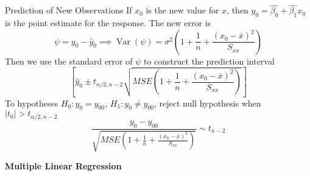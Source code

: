 \documentclass{article}
\DeclareMathOperator{\Var}{Var}
\begin{document}
\begin{multicols*}{3}
\begin{blackbox}{Prediction of New Observations}
        If $x_0$ is the new value for $x$, then $\hat{y}_0 = \hat{\beta_0} + \hat{\beta_1}x_0$ is the point estimate for the response. The new error is \\[-4ex]
        \[\psi = y_0 - \hat{y}_0 \implies \Var(\psi) = \sigma^2\left(1+\frac{1}{n} + \frac{(x_0-\bar{x})^2}{S_{xx}}\right)\]
        Then we use the standard error of $\psi$ to construct the prediction interval 
        \[\left[\hat{y}_0 \pm t_{\alpha/2, n-2} \sqrt{MSE\left(1+\frac{1}{n} + \frac{(x_0-\bar{x})^2}{S_{xx}}\right)}\right]\]
        To hypotheses $H_0: y_0 = y_{00}$, $H_1: y_0 \neq y_{00}$, reject null hypothesis when $|t_0| > t_{\alpha/2, n-2}$
        \[\frac{y_0 - y_{00}}{\sqrt{MSE\left(1+\frac{1}{n} + \frac{(x_0-\bar{x})^2}{S_{xx}}\right)}} \sim  t_{n-2}\]
    \end{blackbox}
\end{multicols*}

\begin{center}{\large{\textbf{Multiple Linear Regression}}}\\
\end{center}
\end{document}
